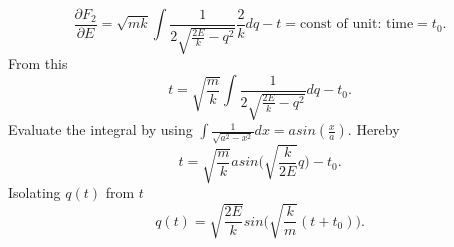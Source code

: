 \begin{example}
	\begin{equation}
		\frac{\partial F_2}{\partial E}=\sqrt{mk}\int\frac{1}{2\sqrt{\frac{2E}{k}-q^2}}\frac{2}{k}dq-t=\text{const of unit: time}=t_0. 
	\end{equation} 
	From this
	\begin{equation}
		t=\sqrt{\frac{m}{k}}\int\frac{1}{2\sqrt{\frac{2E}{k}-q^2}}dq-t_0.
	\end{equation} 
	Evaluate the integral by using $\int \frac{1}{\sqrt{a^2-x^2}}dx=asin(\frac{x}{a})$. Hereby
	\begin{equation}
		t=\sqrt{\frac{m}{k}}asin\bigg(\sqrt{\frac{k}{2E}}q\bigg)-t_0.
	\end{equation} 
	Isolating $q(t)$ from $t$
	\begin{equation}
		q(t)=\sqrt{\frac{2E}{k}}sin\bigg(\sqrt{\frac{k}{m}}(t+t_0)\bigg).
	\end{equation} 
\end{example}
